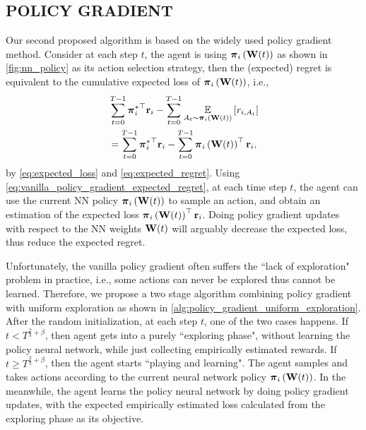 \subsection{POLICY GRADIENT}
\label{subsec:policy_gradient}

Our second proposed algorithm is based on the widely used policy gradient method. Consider at each step $t$, the agent is using ${\boldsymbol{\pi}}_i\left({\mathbf{W}}(t)\right)$ as shown in \cref{fig:nn_policy} as its action selection strategy, then the (expected) regret is equivalent to the cumulative expected loss of ${\boldsymbol{\pi}}_i\left({\mathbf{W}}(t)\right)$, i.e., 
\begin{equation}
\label{eq:vanilla_policy_gradient_expected_regret}
\begin{split}
    &\sum\limits_{t=0}^{T-1}{{{\boldsymbol{\pi}}_i^*}^\top {\mathbf{r}}_i} - \sum\limits_{t=0}^{T-1}{ \operatorname*{{\mathbb{E}}}\limits_{A_t \sim {\boldsymbol{\pi}}_i\left({\mathbf{W}}(t)\right)} \left[ r_{i, A_t} \right] } \\
    &= \sum\limits_{t=0}^{T-1}{{{\boldsymbol{\pi}}_i^*}^\top {\mathbf{r}}_i} - \sum\limits_{t=0}^{T-1}{{\boldsymbol{\pi}}_i\left({\mathbf{W}}(t)\right)^\top {\mathbf{r}}_i},
\end{split}
\end{equation}
by \cref{eq:expected_loss} and \cref{eq:expected_regret}. Using \cref{eq:vanilla_policy_gradient_expected_regret}, at each time step $t$, the agent can use the current NN policy ${\boldsymbol{\pi}}_i\left({\mathbf{W}}(t)\right)$ to sample an action, and obtain an estimation of the expected loss ${\boldsymbol{\pi}}_i\left({\mathbf{W}}(t)\right)^\top {\mathbf{r}}_i$. Doing policy gradient updates with respect to the NN weights ${\mathbf{W}}(t)$ will arguably decrease the expected loss, thus reduce the expected regret. 

Unfortunately, the vanilla policy gradient often suffers the ``lack of exploration" problem in practice, i.e., some actions can never be explored thus cannot be learned. Therefore, we propose a two stage algorithm combining policy gradient with uniform exploration as shown in \cref{alg:policy_gradient_uniform_exploration}. After the random initialization, at each step $t$, one of the two cases happens. If $t < T^{\frac{2}{3} + \beta}$, then agent gets into a purely ``exploring phase", without learning the policy neural network, while just collecting empirically estimated rewards. If $t \ge T^{\frac{2}{3} + \beta}$, then the agent starts ``playing and learning". The agent samples and takes actions according to the current neural network policy ${\boldsymbol{\pi}}_{i}\left({\mathbf{W}}(t)\right)$. In the meanwhile, the agent learns the policy neural network by doing policy gradient updates, with the expected empirically estimated loss calculated from the exploring phase as its objective.

